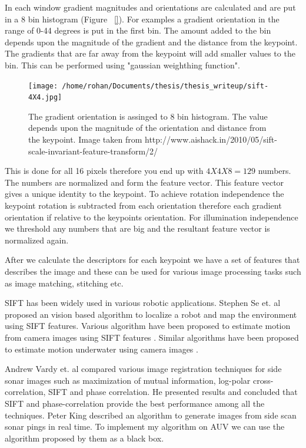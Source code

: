 \documentclass[12pt,draft]{dalcsthesis}
\begin{document}
In each window gradient magnitudes and orientations are calculated and are put in a 8 bin histogram (Figure ~\ref{}). For examples a gradient orientation in the range of 0-44 degrees is put in the first bin. The amount added to the bin depends upon the magnitude of the gradient and the distance from the keypoint. The gradients that are far away from the keypoint will add smaller values to the bin. This can be performed using "gaussian weighthing function". 

\begin{figure}
  \centering
     {\texttt{[image: /home/rohan/Documents/thesis/thesis\_writeup/sift-4X4.jpg]}}
  \caption{\label{fig- sift bin histogram} The gradient orientation is assinged to 8 bin histogram. The value depends upon the magnitude of the orientation and distance from the keypoint. Image taken from \cite{}{http://www.aishack.in/2010/05/sift-scale-invariant-feature-transform/2/} }
\end{figure}

This is done for all 16 pixels therefore you end up with $4X4X8=129$ numbers. The numbers are normalized and form the feature vector. This feature vector gives a unique identity to the keypoint. To achieve rotation independence the keypoint rotation is subtracted from each orientation therefore each gradient orientation if relative to the keypoints orientation. For illumination independence we threshold any numbers that are big and the resultant feature vector is normalized again. 

After we calculate the descriptors for each keypoint we have a set of features that describes the image and these can be used for various image processing tasks such as image matching, stitching etc. 

SIFT has  been widely used in various robotic applications. Stephen Se et. al \cite{se2001vision} proposed an vision based algorithm to localize a robot and map the environment using SIFT features. Various algorithm have been proposed to estimate motion from camera images using SIFT features \cite{barfoot2005online} \cite{scaramuzza2008appearance}. Similar algorithms have been proposed to estimate motion underwater using camera images \cite{Silva}.

Andrew Vardy et. al \cite{vandrish2011side} compared various image registration techniques for side sonar images such as  maximization of mutual information, log-polar cross-correlation, SIFT and phase correlation. He presented results and concluded that SIFT and phase-correlation provide the best performance among all the techniques. Peter King \cite{king2012real} described an algorithm to generate images from side scan sonar pings in real time. To implement my algorithm on AUV we can use the algorithm proposed by them as a black box.
\end{document}
